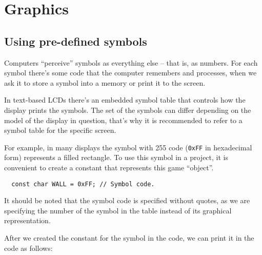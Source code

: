 \documentclass[../sparc.tex]{subfiles}
\begin{document}
\section{Graphics}

\subsection{Using pre-defined symbols}

Computers ``perceive'' symbols as everything else -- that is, as numbers.  For
each symbol there's some code that the computer remembers and processes, when we
ask it to store a symbol into a memory or print it to the screen.


In text-based LCDs there's an embedded symbol table that controls how the
display prints the symbols.  The set of the symbols can differ depending on the
model of the display in question, that's why it is recommended to refer to a
symbol table for the specific screen.

For example, in many displays the symbol with 255 code (\texttt{0xFF}
in hexadecimal form) represents a filled rectangle.  To use this symbol in a
project, it is convenient to create a constant that represents this game
``object''.

\begin{verbatim}
  const char WALL = 0xFF; // Symbol code.
\end{verbatim}

It should be noted that the symbol code is specified without quotes, as we are
specifying the number of the symbol in the table instead of its graphical
representation.

After we created the constant for the symbol in the code, we can print it in the
code as follows:
\end{document}
